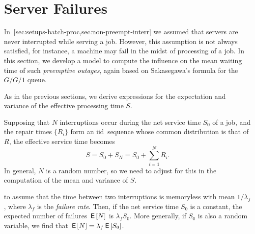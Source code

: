

\section{Server Failures}
\label{sec:preempt-interr-serv}

In~\cref{sec:setups-batch-proc,sec:non-preempt-interr} we assumed that servers are never interrupted while serving a job.
However, this assumption is not always satisfied, for instance, a machine may fail in the midst of processing of a job.
In this section, we develop a model
to compute the influence on the mean waiting time of such \emph{preemptive outages}, again based on Sakasegawa's formula for the $G/G/1$ queue.



As in the previous sections, we derive expressions for the expectation and variance of the effective processing time $S$.

Supposing that $N$ interruptions occur during the net service time $S_0$ of a job, and the repair times $\{R_i\}$ form an iid\ sequence whose common distribution is that of $R$, the effective service time becomes
\begin{equation*}
  S= S_0 + S_N = S_0 + \sum_{i=1}^N R_i.
\end{equation*}
In general,  $N$ is a random number, so we need to adjust for this in the computation of the mean and variance of $S$.


 to assume that the time between two interruptions is memoryless with mean $1/\lambda_f$, where $\lambda_f$ is the \emph{failure rate}.
Then, if the net service time $S_0$ is a constant, the expected number of failures $\,\mathsf{E}\left[N\right]$ is $\lambda_f S_0$.
More generally, if $S_0$ is also a random variable, we find that $\,\mathsf{E}\left[N\right] =\lambda_f \,\mathsf{E}\left[S_0\right]$.

